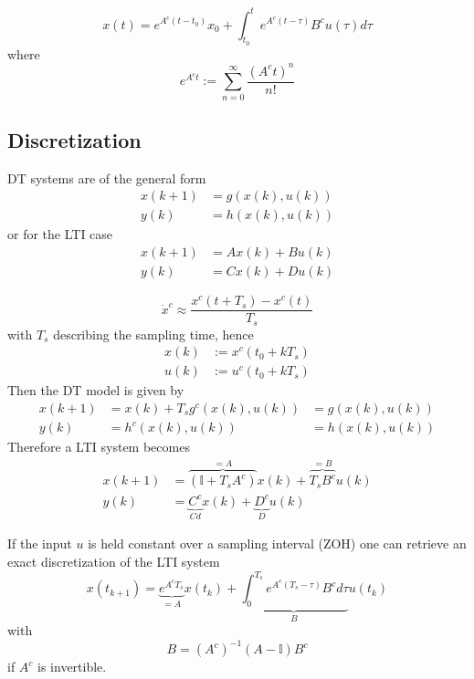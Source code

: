 
\begin{equation*}
    x(t) = e^{A^c(t-t_0)}x_0 + \int_{t_0}^{t}e^{A^c(t-\tau)}B^c u(\tau)d\tau
\end{equation*}
where
\begin{equation*}
    e^{A^c t} := \sum_{n=0}^{\infty}\frac{{(A^c t)}^n}{n!}
\end{equation*}

\subsection{Discretization}
DT systems are of the general form
\begin{align*}
    x(k+1) & =g(x(k),u(k)) \\
    y(k)   & =h(x(k),u(k))
\end{align*}
or for the LTI case
\begin{align*}
    x(k+1) & =A x(k)+B u(k) \\
    y(k)   & =C x(k)+D u(k)
\end{align*}

\begin{equation*}
    \dot{x}^c \approx \frac{x^c(t + T_s)-x^c(t)}{T_s}
\end{equation*}
with $T_s$ describing the sampling time, hence
\begin{align*}
    x(k) & := x^c(t_0 + kT_s) \\
    u(k) & := u^c(t_0 + kT_s)
\end{align*}
Then the DT model is given by
\begin{align*}
    x(k+1) & = x(k) + T_s g^c (x(k),u(k)) & = g(x(k),u(k)) \\
    y(k)   & = h^c(x(k),u(k))             & = h(x(k),u(k))
\end{align*}
Therefore a LTI system becomes
\begin{align*}
    x(k+1) & = \overbrace{(\mathbb{I} + T_s A^c)}^{=A} x(k) + \overbrace{T_s B^c}^{=B} u(k) \\
    y(k)   & = \underbrace{C^c}_{Cd} x(k) + \underbrace{D^c}_{D} u(k)
\end{align*}

\newpar{}

If the input $u$ is held constant over a sampling interval (ZOH) one can retrieve an exact discretization of the LTI system
\begin{equation*}
    x(t_{k+1}) = \underbrace{e^{A^c T_s}}_{=A} x(t_k) + \underbrace{\int_{0}^{T_s} e^{A^c(T_s - \tau)}B^c d\tau}_{B} u(t_k)
\end{equation*}
with
\begin{equation*}
    B={(A^c)}^{-1}(A-\mathbb{I})B^c
\end{equation*}
if $A^c$ is invertible.

